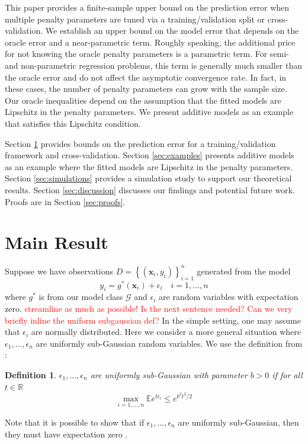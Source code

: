 \documentclass[12pt]{article}
\newtheorem{definition}{Definition}
\begin{document}
This paper provides a finite-sample upper bound on the prediction error when multiple penalty parameters are tuned via a training/validation split or cross-validation. We establish an upper bound on the model error that depends on the oracle error and a near-parametric term. Roughly speaking, the additional price for not knowing the oracle penalty parameters is a parametric term. For semi- and non-parametric regression problems, this term is generally much smaller than the oracle error and do not affect the asymptotic convergence rate. In fact, in these cases, the number of penalty parameters can grow with the sample size. Our oracle inequalities depend on the assumption that the fitted models are Lipschitz in the penalty parameters. We present additive models as an example that satisfies this Lipschitz condition.

Section \ref{sec:main_results} provides bounds on the prediction error for a training/validation framework and cross-validation.
Section \ref{sec:examples} presents additive models as an example where the fitted models are Lipschitz in the penalty parameters.
Section \ref{sec:simulations} provides a simulation study to support our theoretical results.
Section \ref{sec:discussion} discusses our findings and potential future work.
Proofs are in Section \ref{sec:proofs}.

\section{Main Result} \label{sec:main_results}

Suppose we have observations $D = \left \{ (\boldsymbol{x}_i, y_i) \right \}_{i=1}^n$ generated from the model
\begin{equation}
y_i = g^*(\boldsymbol x_i) + \epsilon_i \quad i=1,...,n
\end{equation}
where $g^*$ is from our model class $\mathcal{G}$ and $\epsilon_i$ are random variables with expectation zero. \textcolor{red}{streamline as much as possible! Is the next sentence needed? Can we very briefly inline the uniform subgaussian def?} In the simple setting, one may assume that $\epsilon_i$ are normally distributed. Here we consider a more general situation where $\epsilon_1,...,\epsilon_n$ are uniformly sub-Gaussian random variables. We use the definition from \citep{Buldygin1980}:
\begin{definition}
	$\epsilon_1, ..., \epsilon_n$ are uniformly sub-Gaussian with parameter $b>0$ if for all $t \in \mathbb{R}$
	\begin{equation}
	\max_{i=1,...,n} \mathbb{E} e^{t \epsilon_i} \le e^{b^2t^2/2}
	\end{equation}
\end{definition}
Note that it is possible to show that if $\epsilon_1,...,\epsilon_n$ are uniformly sub-Gaussian, then they must have expectation zero \citep{stromberg1994probability}.
\end{document}
